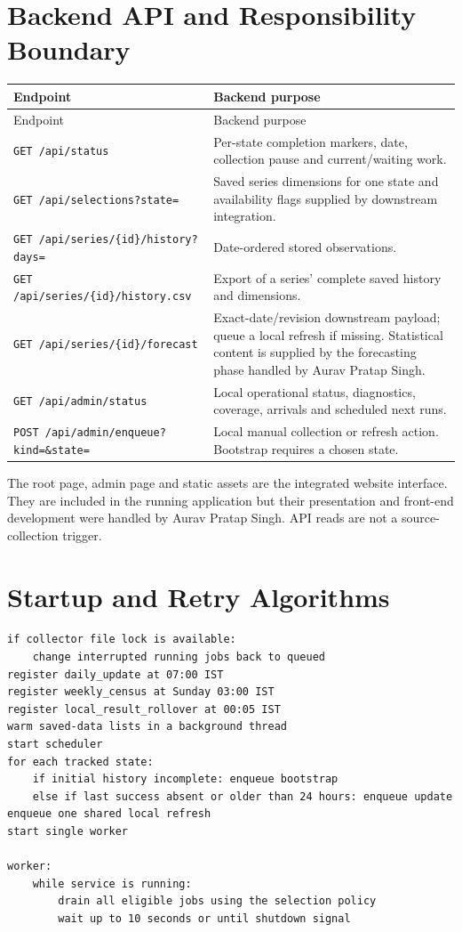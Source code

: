 \documentclass[12pt,a4paper,oneside]{report}
\newcommand{\auravname}{Aurav Pratap Singh}
\numberwithin{equation}{chapter}
\numberwithin{figure}{chapter}
\numberwithin{table}{chapter}
\theoremstyle{definition}
\begin{document}
\chapter{Backend API and Responsibility Boundary}
\begin{longtable}{@{}p{}p{}@{}}
\toprule
Endpoint & Backend purpose \\
\midrule
\endfirsthead
\toprule
Endpoint & Backend purpose \\
\midrule
\endhead
\texttt{GET /api/status} & Per-state completion markers, date, collection pause and current/waiting work. \\
\texttt{GET /api/selections?state=} & Saved series dimensions for one state and availability flags supplied by downstream integration. \\
\texttt{GET /api/series/\{id\}/history?days=} & Date-ordered stored observations. \\
\texttt{GET /api/series/\{id\}/history.csv} & Export of a series' complete saved history and dimensions. \\
\texttt{GET /api/series/\{id\}/forecast} & Exact-date/revision downstream payload; queue a local refresh if missing. Statistical content is supplied by the forecasting phase handled by \auravname. \\
\texttt{GET /api/admin/status} & Local operational status, diagnostics, coverage, arrivals and scheduled next runs. \\
\texttt{POST /api/admin/enqueue?kind=\&state=} & Local manual collection or refresh action. Bootstrap requires a chosen state. \\
\bottomrule
\end{longtable}

The root page, admin page and static assets are the integrated website interface. They are included in the running application but their presentation and front-end development were handled by \auravname. API reads are not a source-collection trigger.

\chapter{Startup and Retry Algorithms}
\begin{lstlisting}[caption={Startup recovery and registration, simplified}]
if collector file lock is available:
    change interrupted running jobs back to queued
register daily_update at 07:00 IST
register weekly_census at Sunday 03:00 IST
register local_result_rollover at 00:05 IST
warm saved-data lists in a background thread
start scheduler
for each tracked state:
    if initial history incomplete: enqueue bootstrap
    else if last success absent or older than 24 hours: enqueue update
enqueue one shared local refresh
start single worker

worker:
    while service is running:
        drain all eligible jobs using the selection policy
        wait up to 10 seconds or until shutdown signal
\end{lstlisting}
\end{document}
